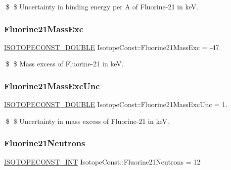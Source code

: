 \$ \$ Uncertainty in binding energy per A of Fluorine-\/21 in keV. \mbox{\label{group___isotope_const-_fluorine-_f21_gab5b4d5ee16ad03ef6e809fd977445904}} 
\subsubsection{\texorpdfstring{Fluorine21\+Mass\+Exc}{Fluorine21MassExc}}
{\footnotesize\ttfamily \mbox{\hyperlink{group___isotope_const-_macros_ga8f45a7272ce02c0b4c65c44636ed719a}{I\+S\+O\+T\+O\+P\+E\+C\+O\+N\+S\+T\+\_\+\+D\+O\+U\+B\+LE}} Isotope\+Const\+::\+Fluorine21\+Mass\+Exc = -\/47.}

\$ \$ Mass excess of Fluorine-\/21 in keV. \mbox{\label{group___isotope_const-_fluorine-_f21_ga9fc1ea343170f29bd6f4e06f1cb8e406}} 
\subsubsection{\texorpdfstring{Fluorine21\+Mass\+Exc\+Unc}{Fluorine21MassExcUnc}}
{\footnotesize\ttfamily \mbox{\hyperlink{group___isotope_const-_macros_ga8f45a7272ce02c0b4c65c44636ed719a}{I\+S\+O\+T\+O\+P\+E\+C\+O\+N\+S\+T\+\_\+\+D\+O\+U\+B\+LE}} Isotope\+Const\+::\+Fluorine21\+Mass\+Exc\+Unc = 1.}

\$ \$ Uncertainty in mass excess of Fluorine-\/21 in keV. \mbox{\label{group___isotope_const-_fluorine-_f21_ga7d8bc61c6ef36ff40b4596ae56d8bd68}} 
\subsubsection{\texorpdfstring{Fluorine21\+Neutrons}{Fluorine21Neutrons}}
{\footnotesize\ttfamily \mbox{\hyperlink{group___isotope_const-_macros_ga5f18360b3e99483a35c32d789e62621c}{I\+S\+O\+T\+O\+P\+E\+C\+O\+N\+S\+T\+\_\+\+I\+NT}} Isotope\+Const\+::\+Fluorine21\+Neutrons = 12}

